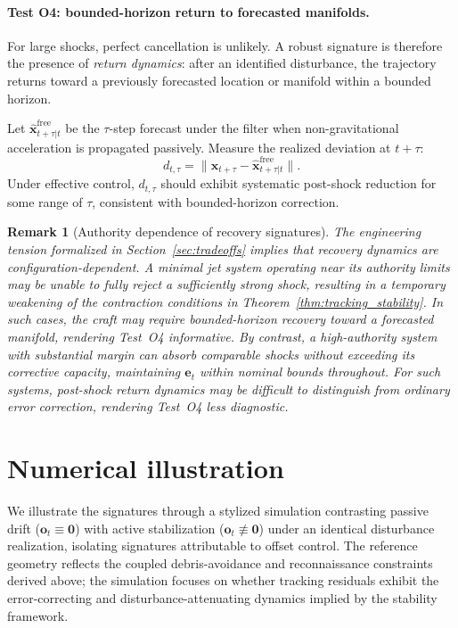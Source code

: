\documentclass{article}
\newtheorem{remark}{Remark}
\begin{document}
\paragraph{Test O4: bounded-horizon return to forecasted manifolds.}
For large shocks, perfect cancellation is unlikely. A robust signature is therefore the presence of \emph{return dynamics}: after an identified disturbance, the trajectory returns toward a previously forecasted location or manifold within a bounded horizon.

Let $\hat{\mathbf{x}}^{\mathrm{free}}_{t+\tau|t}$ be the $\tau$-step forecast under the filter when non-gravitational acceleration is propagated passively. Measure the realized deviation at $t+\tau$:
\[
d_{t,\tau} = \|\mathbf{x}_{t+\tau}-\hat{\mathbf{x}}^{\mathrm{free}}_{t+\tau|t}\|.
\]
Under effective control, $d_{t,\tau}$ should exhibit systematic post-shock reduction for some range of $\tau$, consistent with bounded-horizon correction.

\begin{remark}[Authority dependence of recovery signatures]
The engineering tension formalized in Section~\ref{sec:tradeoffs} implies that recovery dynamics are configuration-dependent. A minimal jet system operating near its authority limits may be unable to fully reject a sufficiently strong shock, resulting in a temporary weakening of the contraction conditions in Theorem~\ref{thm:tracking_stability}. In such cases, the craft may require bounded-horizon recovery toward a forecasted manifold, rendering Test~O4 informative. By contrast, a high-authority system with substantial margin can absorb comparable shocks without exceeding its corrective capacity, maintaining $\mathbf{e}_t$ within nominal bounds throughout. For such systems, post-shock return dynamics may be difficult to distinguish from ordinary error correction, rendering Test~O4 less diagnostic.
\end{remark}


\section{Numerical illustration}
\label{sec:numerical_illustration}


We illustrate the signatures through a stylized simulation contrasting passive drift ($\mathbf{o}_t\equiv\mathbf{0}$) with active stabilization ($\mathbf{o}_t\not\equiv\mathbf{0}$) under an identical disturbance realization, isolating signatures attributable to offset control. The reference geometry reflects the coupled debris-avoidance and reconnaissance constraints derived above; the simulation focuses on whether tracking residuals exhibit the error-correcting and disturbance-attenuating dynamics implied by the stability framework.
\end{document}
